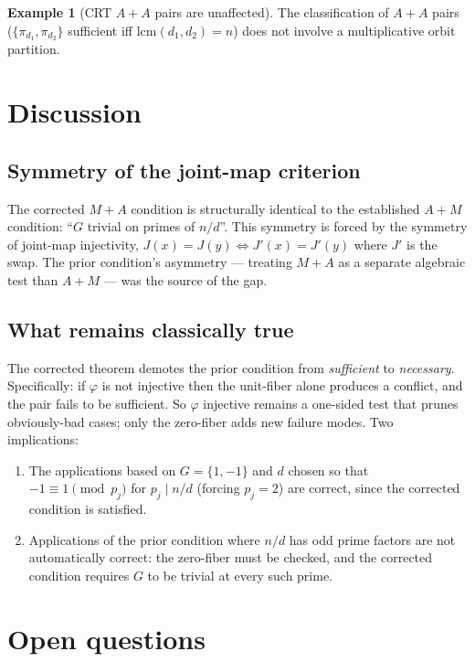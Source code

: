 \documentclass[11pt,reqno]{amsart}
\theoremstyle{plain}
\theoremstyle{definition}
\newtheorem{example}[theorem]{Example}
\begin{document}
\begin{example}[CRT $A{+}A$ pairs are unaffected]
The classification of $A{+}A$ pairs ($\{\pi_{d_1}, \pi_{d_2}\}$ sufficient iff $\mathrm{lcm}(d_1,d_2) = n$) does not involve a multiplicative orbit partition.
\end{example}

\section{Discussion}

\subsection{Symmetry of the joint-map criterion}

The corrected $M{+}A$ condition is structurally identical to the established $A{+}M$ condition: ``$G$ trivial on primes of $n/d$''. This symmetry is forced by the symmetry of joint-map injectivity, $J(x) = J(y) \Leftrightarrow J'(x) = J'(y)$ where $J'$ is the swap. The prior condition's asymmetry --- treating $M{+}A$ as a separate algebraic test than $A{+}M$ --- was the source of the gap.

\subsection{What remains classically true}

The corrected theorem demotes the prior condition from \emph{sufficient} to \emph{necessary}. Specifically: if $\varphi$ is not injective then the unit-fiber alone produces a conflict, and the pair fails to be sufficient. So $\varphi$ injective remains a one-sided test that prunes obviously-bad cases; only the zero-fiber adds new failure modes. Two implications:
\begin{enumerate}[label=(\alph*)]
\item The applications based on $G = \{1,-1\}$ and $d$ chosen so that $-1 \equiv 1 \pmod{p_j}$ for $p_j \mid n/d$ (forcing $p_j = 2$) are correct, since the corrected condition is satisfied.
\item Applications of the prior condition where $n/d$ has odd prime factors are not automatically correct: the zero-fiber must be checked, and the corrected condition requires $G$ to be trivial at every such prime.
\end{enumerate}

\section{Open questions}
\end{document}
